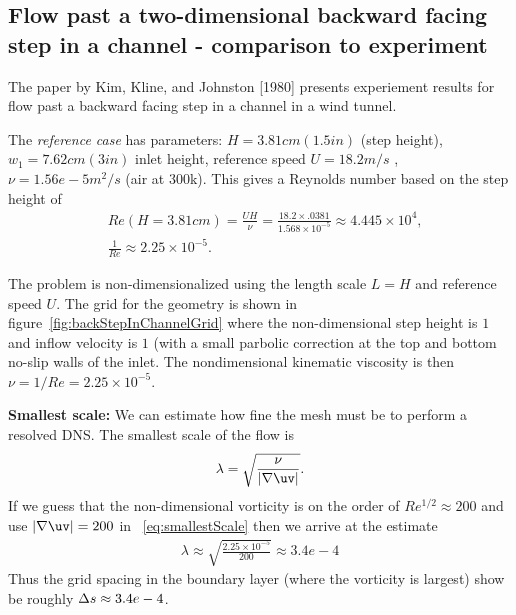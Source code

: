 \clearpage
\subsection{Flow past a two-dimensional backward facing step in a channel - comparison to experiment }

The paper by Kim, Kline, and Johnston [1980] presents experiement results for flow past a
backward facing step in a channel in a wind tunnel. 

The {\em reference case} has parameters: $H=3.81 cm (1.5 in)$ (step height), $w_1 = 7.62cm (3 in)$ inlet height,
reference speed $U=18.2 m/s$ , $\nu=1.56 e-5 m^2/s$ (air at 300k). This gives
a Reynolds number based on the step height of
\begin{align*}
 &  Re(H=3.81 cm) = \frac{U H}{\nu} = \frac{18.2 \times .0381}{1.568 \times 10^{-5}} \approx  4.445 \times 10^4, \\
 &  \frac{1}{Re} \approx 2.25 \times 10^{-5}. 
\end{align*}

The problem is non-dimensionalized using the length scale $L=H$ and reference speed $U$. 
The grid for the geometry is shown in figure~\ref{fig:backStepInChannelGrid} where the non-dimensional
step height is $1$ and inflow velocity is $1$ (with a small parbolic correction at the top and bottom
no-slip walls of the inlet. The nondimensional kinematic viscosity is then $\nu= 1/Re = 2.25 \times 10^{-5}$. 

{\bf Smallest scale:} We can estimate how fine the mesh must be to perform a resolved DNS.
The smallest scale of the flow is~\cite{HKR1}
\begin{align}
    \lambda = \sqrt{\frac{\nu}{|\grad\uv|}}.  \label{eq:smallestScale}
\end{align}
If we guess that the non-dimensional vorticity is on the order of $Re^{1/2} \approx 200$ and use $|\grad\uv|=200$ in ~\eqref{eq:smallestScale}
then we arrive at the estimate 
\begin{align*}
    \lambda \approx  \sqrt{\frac{2.25 \times 10^{-5}}{200}} \approx 3.4e-4
\end{align*}
Thus the grid spacing in the boundary layer (where the vorticity is largest) show be roughly $\Delta s\approx 3.4e-4$.

